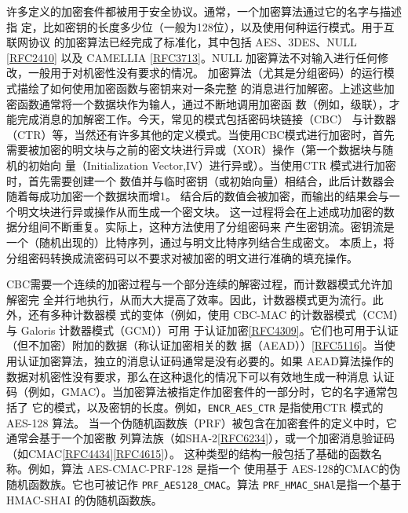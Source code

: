 许多定义的加密套件都被用于安全协议。通常，一个加密算法通过它的名字与描述指
定，比如密钥的长度多少位（一般为128位），以及使用何种运行模式。用于互联网协议
的加密算法已经完成了标准化，其中包括 AES、3DES、NULL \href{https://www.rfc-editor.org/rfc/rfc2410}{[RFC2410]} 以及 CAMELLIA
\href{https://www.rfc-editor.org/rfc/rfc3713}{[RFC3713]}。NULL 加密算法不对输入进行任何修改，一般用于对机密性没有要求的情况。
加密算法（尤其是分组密码）的运行模式描绘了如何使用加密函数与密钥来对一条完整
的消息进行加解密。上述这些加密函数通常将一个数据块作为输人，通过不断地调用加密函
数（例如，级联），才能完成消息的加解密工作。今天，常见的模式包括密码块链接（CBC）
与计数器（CTR）等，当然还有许多其他的定义模式。当使用CBC模式进行加密时，首先
需要被加密的明文块与之前的密文块进行异或（XOR）操作（第一个数据块与随机的初始向
量（Initialization Vector,IV）进行异或）。当使用CTR 模式进行加密时，首先需要创建一个
数值并与临时密钥（或初始向量）相结合，此后计数器会随着每成功加密一个数据块而增1。
结合后的数值会被加密，而输出的结果会与一个明文块进行异或操作从而生成一个密文块。
这一过程将会在上述成功加密的数据分组间不断重复。实际上，这种方法使用了分组密码来
产生密钥流。密钥流是一个（随机出现的）比特序列，通过与明文比特序列结合生成密文。
本质上，将分组密码转换成流密码可以不要求对被加密的明文进行准确的填充操作。

CBC需要一个连续的加密过程与一个部分连续的解密过程，而计数器模式允许加解密完
全并行地执行，从而大大提高了效率。因此，计数器模式更为流行。此外，还有多种计数器模
式的变体（例如，使用 CBC-MAC 的计数器模式（CCM）与 Galoris 计数器模式（GCM））可用
于认证加密\href{https://www.rfc-editor.org/rfc/rfc4309}{[RFC4309]}。它们也可用于认证（但不加密）附加的数据（称认证加密相关的数
据（AEAD））\href{https://www.rfc-editor.org/rfc/rfc5116}{[RFC5116]}。当使用认证加密算法，独立的消息认证码通常是没有必要的。如果
AEAD算法操作的数据对机密性没有要求，那么在这种退化的情况下可以有效地生成一种消息
认证码（例如，GMAC）。当加密算法被指定作加密套件的一部分时，它的名字通常包括了
它的模式，以及密钥的长度。例如，\verb|ENCR_AES_CTR| 是指使用CTR 模式的AES-128 算法。
当一个伪随机函数族（PRF）被包含在加密套件的定义中时，它通常会基于一个加密散
列算法族（如SHA-2\href{https://www.rfc-editor.org/rfc/rfc6234}{[RFC6234]}），或一个加密消息验证码（如CMAC\href{https://www.rfc-editor.org/rfc/rfc4434}{[RFC4434]}\href{https://www.rfc-editor.org/rfc/rfc4615}{[RFC4615]}）。
这种类型的结构一般包括了基础的函数名称。例如，算法 AES-CMAC-PRF-128 是指一个
使用基于 AES-128的CMAC的伪随机函数族。它也可被记作 \verb|PRF_AES128_CMAC|。算法
\verb|PRF_HMAC_SHAl|是指一个基于 HMAC-SHAI 的伪随机函数族。

